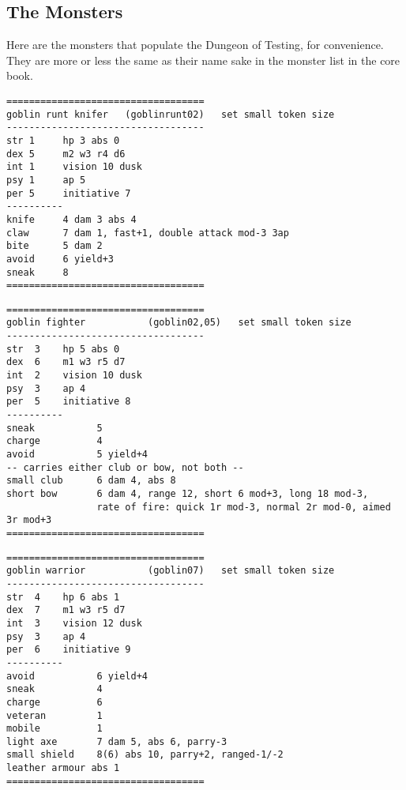 \raggedbottom
\vfill

\subsection*{The Monsters}

Here are the monsters that populate the Dungeon of Testing, for convenience. They are more or less the same as their name sake in the monster list in the core book.


\goodbreak \begin{samepage} \small \begin{verbatim}
===================================
goblin runt knifer   (goblinrunt02)   set small token size
-----------------------------------
str 1     hp 3 abs 0
dex 5     m2 w3 r4 d6
int 1     vision 10 dusk
psy 1     ap 5
per 5     initiative 7
----------
knife     4 dam 3 abs 4
claw      7 dam 1, fast+1, double attack mod-3 3ap
bite      5 dam 2
avoid     6 yield+3
sneak     8
===================================
\end{verbatim} \normalsize \end{samepage}


\goodbreak \begin{samepage} \small \begin{verbatim}
===================================
goblin fighter           (goblin02,05)   set small token size
-----------------------------------
str  3    hp 5 abs 0
dex  6    m1 w3 r5 d7
int  2    vision 10 dusk
psy  3    ap 4
per  5    initiative 8
----------
sneak           5
charge          4
avoid           5 yield+4
-- carries either club or bow, not both --
small club      6 dam 4, abs 8
short bow       6 dam 4, range 12, short 6 mod+3, long 18 mod-3,
                rate of fire: quick 1r mod-3, normal 2r mod-0, aimed 3r mod+3
===================================
\end{verbatim} \normalsize \end{samepage}



\goodbreak \begin{samepage} \small \begin{verbatim}
===================================
goblin warrior           (goblin07)   set small token size
-----------------------------------
str  4    hp 6 abs 1
dex  7    m1 w3 r5 d7
int  3    vision 12 dusk
psy  3    ap 4
per  6    initiative 9
----------
avoid           6 yield+4
sneak           4
charge          6
veteran         1
mobile          1
light axe       7 dam 5, abs 6, parry-3
small shield    8(6) abs 10, parry+2, ranged-1/-2
leather armour abs 1
===================================
\end{verbatim} \normalsize \end{samepage}

